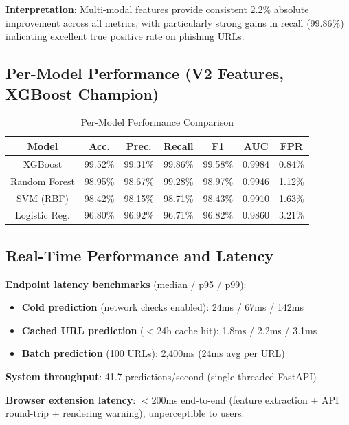 \documentclass[conference]{IEEEtran}
\begin{document}
\textbf{Interpretation}: Multi-modal features provide consistent 2.2\% absolute improvement across all metrics, with particularly strong gains in recall (99.86\%) indicating excellent true positive rate on phishing URLs.

\subsection{Per-Model Performance (V2 Features, XGBoost Champion)}

\begin{table}[htbp]
\caption{Per-Model Performance Comparison}
\begin{center}
\begin{tabular}{|c|c|c|c|c|c|c|}
\hline
\textbf{Model} & \textbf{Acc.} & \textbf{Prec.} & \textbf{Recall} & \textbf{F1} & \textbf{AUC} & \textbf{FPR} \\
\hline
XGBoost & 99.52\% & 99.31\% & 99.86\% & 99.58\% & 0.9984 & 0.84\% \\
\hline
Random Forest & 98.95\% & 98.67\% & 99.28\% & 98.97\% & 0.9946 & 1.12\% \\
\hline
SVM (RBF) & 98.42\% & 98.15\% & 98.71\% & 98.43\% & 0.9910 & 1.63\% \\
\hline
Logistic Reg. & 96.80\% & 96.92\% & 96.71\% & 96.82\% & 0.9860 & 3.21\% \\
\hline
\end{tabular}
\label{tab:models}
\end{center}
\end{table}

\subsection{Real-Time Performance and Latency}

\textbf{Endpoint latency benchmarks} (median / p95 / p99):
\begin{itemize}
\item \textbf{Cold prediction} (network checks enabled): 24ms / 67ms / 142ms
\item \textbf{Cached URL prediction} ($<$24h cache hit): 1.8ms / 2.2ms / 3.1ms
\item \textbf{Batch prediction} (100 URLs): 2,400ms (24ms avg per URL)
\end{itemize}

\textbf{System throughput}: 41.7 predictions/second (single-threaded FastAPI)

\textbf{Browser extension latency}: $<$200ms end-to-end (feature extraction + API round-trip + rendering warning), unperceptible to users.
\end{document}
